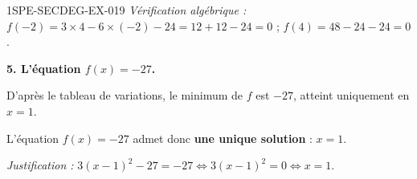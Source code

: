 \begin{corrige}{1SPE-SECDEG-EX-019}
\textit{Vérification algébrique :} $f(-2) = 3\times 4 - 6\times(-2) - 24 = 12 + 12 - 24 = 0$ \checkmark ; $f(4) = 48 - 24 - 24 = 0$ \checkmark.

\medskip
\textbf{5. L'équation $f(x) = -27$.}


D'après le tableau de variations, le minimum de $f$ est $-27$, atteint uniquement en $x = 1$.

L'équation $f(x) = -27$ admet donc \textbf{une unique solution} : $x = 1$.

\textit{Justification :} $3(x-1)^2 - 27 = -27 \iff 3(x-1)^2 = 0 \iff x = 1$.

\end{corrige}
